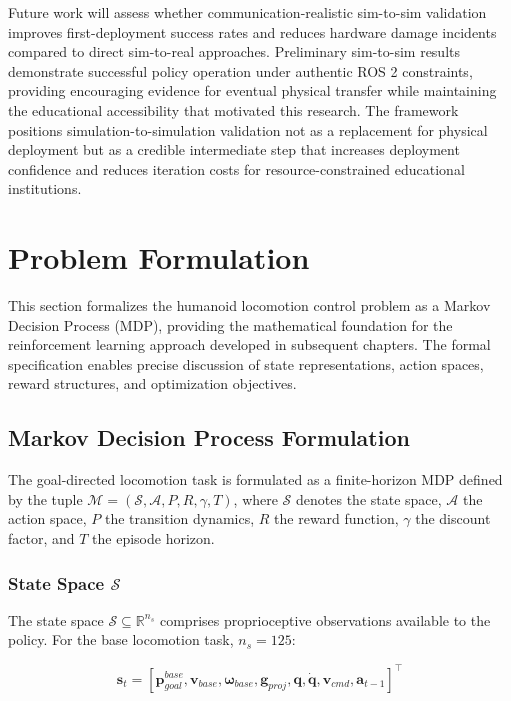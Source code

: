 \documentclass[12pt,a4paper]{article}
\begin{document}
Future work will assess whether communication-realistic sim-to-sim validation improves first-deployment success rates and reduces hardware damage incidents compared to direct sim-to-real approaches. Preliminary sim-to-sim results demonstrate successful policy operation under authentic ROS 2 constraints, providing encouraging evidence for eventual physical transfer while maintaining the educational accessibility that motivated this research. The framework positions simulation-to-simulation validation not as a replacement for physical deployment but as a credible intermediate step that increases deployment confidence and reduces iteration costs for resource-constrained educational institutions.


\newpage

\section{Problem Formulation}

This section formalizes the humanoid locomotion control problem as a Markov Decision Process (MDP), providing the mathematical foundation for the reinforcement learning approach developed in subsequent chapters. The formal specification enables precise discussion of state representations, action spaces, reward structures, and optimization objectives.

\subsection{Markov Decision Process Formulation}

The goal-directed locomotion task is formulated as a finite-horizon MDP defined by the tuple $\mathcal{M} = (\mathcal{S}, \mathcal{A}, P, R, \gamma, T)$, where $\mathcal{S}$ denotes the state space, $\mathcal{A}$ the action space, $P$ the transition dynamics, $R$ the reward function, $\gamma$ the discount factor, and $T$ the episode horizon.

\subsubsection{State Space $\mathcal{S}$}

The state space $\mathcal{S} \subseteq \mathbb{R}^{n_s}$ comprises proprioceptive observations available to the policy. For the base locomotion task, $n_s = 125$:

\begin{equation}
\mathbf{s}_t = \left[ \mathbf{p}_{goal}^{base}, \mathbf{v}_{base}, \boldsymbol{\omega}_{base}, \mathbf{g}_{proj}, \mathbf{q}, \dot{\mathbf{q}}, \mathbf{v}_{cmd}, \mathbf{a}_{t-1} \right]^\top
\label{eq:state_vector}
\end{equation}
\end{document}

